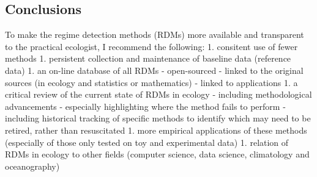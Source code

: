\documentclass[12pt,twoside,openany]{reedthesis}
\begin{document}
\hypertarget{conclusions}{%
\subsection{Conclusions}\label{conclusions}}

To make the regime detection methods (RDMs) more available and transparent to the practical ecologist, I recommend the following:
1. consitent use of fewer methods
1. persistent collection and maintenance of baseline data (reference data)
1. an on-line database of all RDMs
- open-sourced
- linked to the original sources (in ecology and statistics or mathematics)
- linked to applications
1. a critical review of the current state of RDMs in ecology
- including methodological advancements
- especially highlighting where the method fails to perform
- including historical tracking of specific methods to identify which may need to be retired, rather than resuscitated
1. more empirical applications of these methods (especially of those only tested on toy and experimental data)
1. relation of RDMs in ecology to other fields (computer science, data science, climatology and oceanography)
\end{document}
